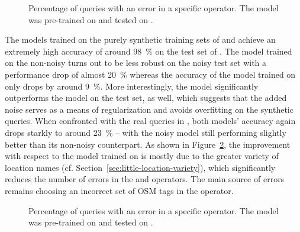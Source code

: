 \begin{figure}[h]
  \centering
  \resizebox{\textwidth}{!}{}
  \caption[Errors pre-trained on \nlmtwoone{}]{Percentage of queries with an
    error in a specific operator. The model was pre-trained on \nlmapstwoone{}
    and tested on \nlmapsfour{}.}
  \label{fig:v21-errors}
\end{figure}

The models trained on the purely synthetic training sets of \nlmthreea{} and
\nlmthreeb{} achieve an extremely high accuracy of around \SI{98}{\%} on the
test set of \nlmthreea{}. The model trained on the non-noisy \nlmthreea{} turns
out to be less robust on the noisy \nlmthreeb{} test set with a performance drop
of almost \SI{20}{\%} whereas the accuracy of the model trained on \nlmthreeb{}
only drops by around \SI{9}{\%}. More interestingly, the \nlmthreeb{} model
significantly outperforms the \nlmthreea{} model on the \nlmtwoone{} test set,
as well, which suggests that the added noise serves as a means of regularization
and avoids overfitting on the synthetic queries. When confronted with the real
queries in \nlmapsfour{}, both models’ accuracy again drops starkly to around
\SI{23}{\%} – with the noisy model still performing slightly better than its
non-noisy counterpart. As shown in Figure~\ref{fig:v3b-errors}, the improvement
with respect to the model trained on \nlmtwoone{} is mostly due to the greater
variety of location names (cf. Section~\ref{sec:little-location-variety}), which
significantly reduces the number of errors in the  and
 operators. The main source of errors remains choosing an
incorrect set of OSM tags in the  operator.

\begin{figure}[h]
  \centering
  \resizebox{\textwidth}{!}{}
  \caption[Errors pre-trained on \nlmtwoone{}]{Percentage of queries with an
    error in a specific operator. The model was pre-trained on \nlmapsthreeb{}
    and tested on \nlmapsfour{}.}
  \label{fig:v3b-errors}
\end{figure}

